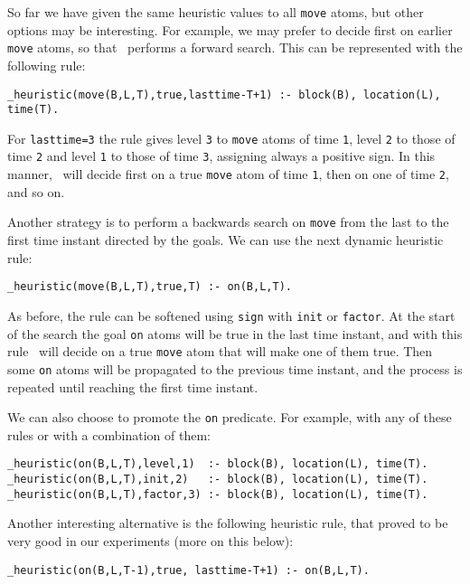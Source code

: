 So far we have given the same heuristic values to all \texttt{move} atoms, 
but other options may be interesting. For example, we may prefer to decide first on earlier \texttt{move} atoms,  
so that \clasp\ performs a forward search. This can be represented with the following rule:
\begin{verbatim}
_heuristic(move(B,L,T),true,lasttime-T+1) :- block(B), location(L), time(T).\end{verbatim}

For \texttt{lasttime=3} the rule gives level \texttt{3} to \texttt{move} atoms of time \texttt{1},  
level \texttt{2} to those of time \texttt{2} and level \texttt{1} to those of time \texttt{3},  
assigning always a positive sign.  In this manner, \clasp\ will decide first on a true \texttt{move} 
atom of time \texttt{1}, then on one of time \texttt{2},  and so on. 

Another strategy is to perform a backwards search on \texttt{move} from the last to the 
first time instant directed by the goals. We can use the next dynamic heuristic rule:
\begin{verbatim}
_heuristic(move(B,L,T),true,T) :- on(B,L,T).\end{verbatim}

As before, the rule can be softened using \texttt{sign} with \texttt{init} or \texttt{factor}. 
At the start of the search the goal \texttt{on} atoms will be true in the last time instant,  
and with this rule \clasp\ will decide on a true \texttt{move} atom that will make one of them true. 
Then some \texttt{on} atoms will be propagated to the previous time instant,  
and the process is repeated until reaching the first time instant. 

 We can also choose to promote the \texttt{on} predicate.  For example, with any of these rules or with a combination of them: 
\begin{verbatim}
_heuristic(on(B,L,T),level,1)  :- block(B), location(L), time(T).
_heuristic(on(B,L,T),init,2)   :- block(B), location(L), time(T).
_heuristic(on(B,L,T),factor,3) :- block(B), location(L), time(T).\end{verbatim}

 Another interesting alternative is the following heuristic rule,  that proved to be very good in our experiments (more on this below): 
\begin{verbatim}
_heuristic(on(B,L,T-1),true, lasttime-T+1) :- on(B,L,T).\end{verbatim}


